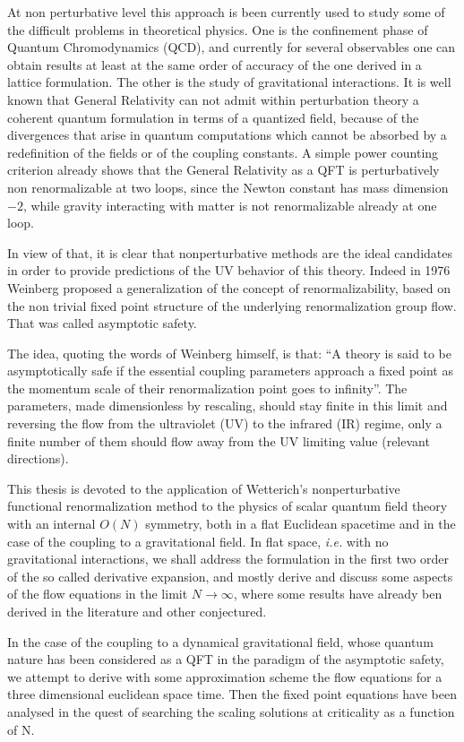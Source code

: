 At non perturbative level this approach is been currently used to study some of the difficult problems in theoretical physics. One is the confinement phase of Quantum Chromodynamics (QCD), and currently for several observables one can obtain results at least at the same order of accuracy of the one derived in a lattice formulation.
The other is the study of gravitational interactions.
It is well known that General Relativity can not admit within perturbation theory a coherent quantum formulation in 
terms of a quantized field, because of the divergences that arise in quantum computations which cannot be absorbed by a redefinition of the fields or of the coupling constants. 
A simple power counting criterion already shows that the General Relativity as a QFT is perturbatively non renormalizable at two loops, since the Newton constant has mass dimension $-2$, while gravity interacting with matter is not renormalizable already at one loop.

In view of that, it is clear that nonperturbative methods are the ideal candidates in order to provide predictions of the UV behavior of this theory. Indeed in 1976 Weinberg proposed a generalization of the concept of renormalizability, based on the non trivial fixed point structure of the underlying renormalization group flow. That was called asymptotic safety. 

The idea, quoting the words of Weinberg himself, is that: ``A theory is said to be asymptotically safe if the essential coupling parameters approach a fixed point as the momentum scale of their renormalization point goes
to infinity''. The parameters, made dimensionless by rescaling, should stay finite in this limit and reversing the flow from the ultraviolet (UV) to the infrared (IR) regime, only a finite number of them should flow away from the UV limiting value (relevant directions).

This thesis is devoted to the application of Wetterich's nonperturbative functional renormalization method to the physics of scalar quantum field theory with an internal $O(N)$ symmetry, both in a flat Euclidean spacetime and in the case of the coupling to a gravitational field.
In flat space, \emph{i.e.} with no gravitational interactions, we shall address the formulation in the first two order of the so called derivative expansion, and mostly derive and discuss some aspects of the flow equations
in the limit $N \to \infty$, where some results have already ben derived in the literature and other conjectured.

In the case of the coupling to a dynamical gravitational field, whose quantum nature has been considered as a QFT in the paradigm of the asymptotic safety, we attempt to derive with some approximation scheme the flow equations for a three dimensional euclidean space time.
Then the fixed point equations have been analysed in the quest of searching the scaling solutions at criticality as a function of N.


